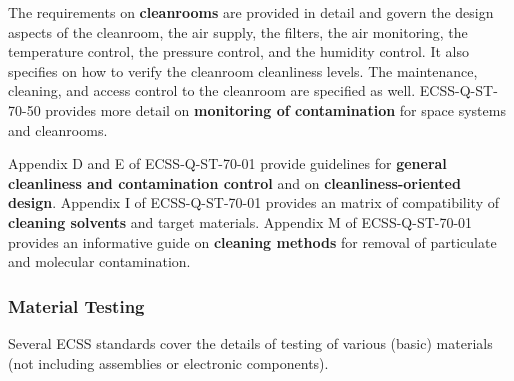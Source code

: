The requirements on \textbf{cleanrooms} are provided in detail and govern the design aspects of the cleanroom, the air supply, the filters, the air monitoring, the temperature control, the pressure control, and the humidity control. It also specifies on how to verify the cleanroom cleanliness levels. The maintenance, cleaning, and access control to the cleanroom are specified as well. ECSS-Q-ST-70-50 \cite{ECSS-Q-ST-70-50} provides more detail on \textbf{monitoring of contamination} for space systems and cleanrooms.

Appendix D and E of ECSS-Q-ST-70-01 provide guidelines for \textbf{general cleanliness and contamination control} and on \textbf{cleanliness-oriented design}. Appendix I of ECSS-Q-ST-70-01 provides an matrix of compatibility of \textbf{cleaning solvents} and target materials. Appendix M of ECSS-Q-ST-70-01 provides an informative guide on \textbf{cleaning methods} for removal of particulate and molecular contamination.

\subsubsection{Material Testing}

Several ECSS standards cover the details of testing of various (basic) materials (not including assemblies or electronic components).

